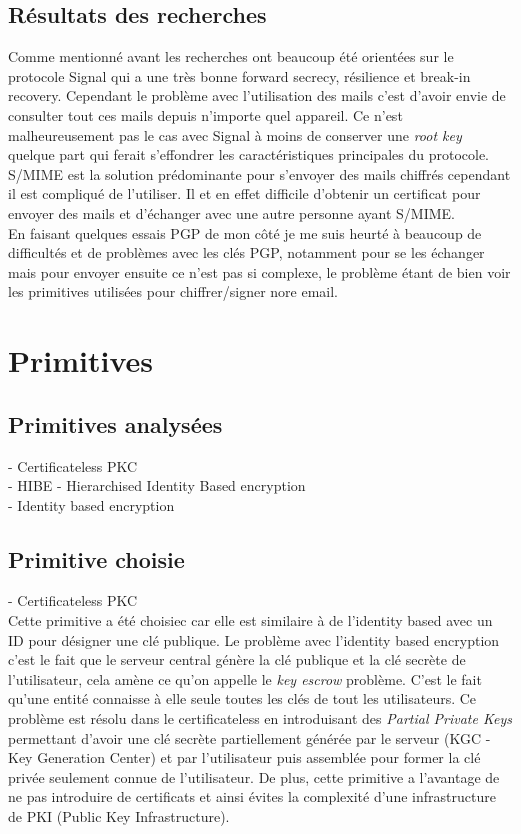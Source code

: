 \subsection{Résultats des recherches}
Comme mentionné avant les recherches ont beaucoup été orientées sur le protocole Signal qui a une très bonne forward secrecy, résilience et break-in recovery. Cependant le problème avec l'utilisation des mails c'est d'avoir envie de consulter tout ces mails depuis n'importe quel appareil. Ce n'est malheureusement pas le cas avec Signal à moins de conserver une \textit{root key} quelque part qui ferait s'effondrer les caractéristiques principales du protocole.\\
S/MIME est la solution prédominante pour s'envoyer des mails chiffrés cependant il est compliqué de l'utiliser. Il et en effet difficile d'obtenir un certificat pour envoyer des mails et d'échanger avec une autre personne ayant S/MIME.\\
En faisant quelques essais PGP de mon côté je me suis heurté à beaucoup de difficultés et de problèmes avec les clés PGP, notamment pour se les échanger mais pour envoyer ensuite ce n'est pas si complexe, le problème étant de bien voir les primitives utilisées pour chiffrer/signer nore email.
\section{Primitives}
\subsection{Primitives analysées}
- Certificateless PKC~\cite{DBLP:conf/asiacrypt/Al-RiyamiP03}\\
- HIBE - Hierarchised Identity Based encryption\\
- Identity based encryption
\subsection{Primitive choisie}
- Certificateless PKC~\cite{DBLP:conf/asiacrypt/Al-RiyamiP03}\\
 Cette primitive a été choisiec car elle est similaire à de l'identity based avec un ID pour désigner une clé publique. Le problème avec l'identity based encryption c'est le fait que le serveur central génère la clé publique et la clé secrète de l'utilisateur, cela amène ce qu'on appelle le \textit{key escrow} problème. C'est le fait qu'une entité connaisse à elle seule toutes les clés de tout les utilisateurs. Ce problème est résolu dans le certificateless en introduisant des \textit{Partial Private Keys} permettant d'avoir une clé secrète partiellement générée par le serveur (KGC - Key Generation Center) et par l'utilisateur puis assemblée pour former la clé privée seulement connue de l'utilisateur. De plus, cette primitive a l'avantage de ne pas introduire de certificats et ainsi évites la complexité d'une infrastructure de PKI (Public Key Infrastructure).
